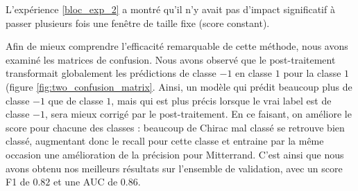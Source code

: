 \documentclass{article}
\begin{document}
L'expérience \ref{bloc_exp_2} a montré qu'il n'y avait pas d'impact significatif à passer plusieurs fois une fenêtre de taille fixe (score constant).

Afin de mieux comprendre l'efficacité remarquable de cette méthode, nous avons examiné les matrices de confusion. Nous avons observé que le post-traitement transformait globalement les prédictions de classe $-1$ en classe $1$ pour la classe $1$ (figure \ref{fig:two_confusion_matrix}. Ainsi, un modèle qui prédit beaucoup plus de classe $-1$ que de classe $1$, mais qui est plus précis lorsque le vrai label est de classe $-1$, sera mieux corrigé par le post-traitement. En ce faisant, on améliore le score pour chacune des classes : beaucoup de Chirac mal classé se retrouve bien classé, augmentant donc le recall pour cette classe et entraine par la même occasion une amélioration de la précision pour Mitterrand. C'est ainsi que nous avons obtenu nos meilleurs résultats sur l'ensemble de validation, avec un score F1 de $0.82$ et une AUC de $0.86$.
\end{document}
